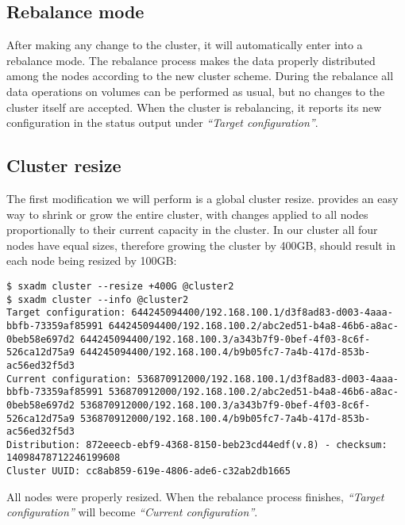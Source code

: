 \subsection{Rebalance mode}
After making any change to the cluster, it will automatically enter into
a rebalance mode. The rebalance process makes the data properly distributed
among the nodes according to the new cluster scheme. During the rebalance
all data operations on volumes can be performed as usual, but no changes
to the cluster itself are accepted. When the cluster is rebalancing, it
reports its new configuration in the status output under
\emph{``Target configuration''}.

\subsection{Cluster resize}
The first modification we will perform is a global cluster resize.
 provides an easy way to shrink or grow
the entire cluster, with changes applied to all nodes proportionally to
their current capacity in the cluster. In our cluster all four nodes
have equal sizes, therefore growing the cluster by 400GB, should result
in each node being resized by 100GB:
\begin{lstlisting}
$ sxadm cluster --resize +400G @cluster2
$ sxadm cluster --info @cluster2
Target configuration: 644245094400/192.168.100.1/d3f8ad83-d003-4aaa-bbfb-73359af85991 644245094400/192.168.100.2/abc2ed51-b4a8-46b6-a8ac-0beb58e697d2 644245094400/192.168.100.3/a343b7f9-0bef-4f03-8c6f-526ca12d75a9 644245094400/192.168.100.4/b9b05fc7-7a4b-417d-853b-ac56ed32f5d3 
Current configuration: 536870912000/192.168.100.1/d3f8ad83-d003-4aaa-bbfb-73359af85991 536870912000/192.168.100.2/abc2ed51-b4a8-46b6-a8ac-0beb58e697d2 536870912000/192.168.100.3/a343b7f9-0bef-4f03-8c6f-526ca12d75a9 536870912000/192.168.100.4/b9b05fc7-7a4b-417d-853b-ac56ed32f5d3 
Distribution: 872eeecb-ebf9-4368-8150-beb23cd44edf(v.8) - checksum: 14098478712246199608
Cluster UUID: cc8ab859-619e-4806-ade6-c32ab2db1665
\end{lstlisting}
All nodes were properly resized. When the rebalance process finishes, \emph{``Target
configuration''} will become \emph{``Current configuration''}.

